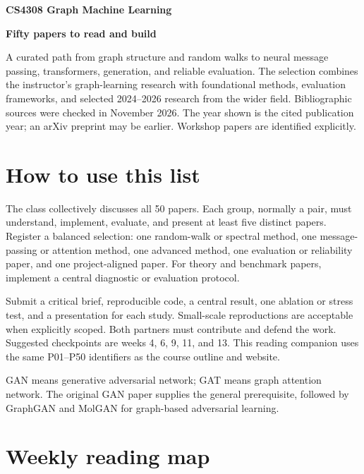 \documentclass[11pt,letterpaper]{article}
\begin{document}
{\Large\bfseries CS4308 Graph Machine Learning}\par
{\huge\bfseries Fifty papers to read and build}\par
\vspace{5pt}
A curated path from graph structure and random walks to neural message passing, transformers, generation, and reliable evaluation. The selection combines the instructor's graph-learning research with foundational methods, evaluation frameworks, and selected 2024--2026 research from the wider field. Bibliographic sources were checked in November 2026. The year shown is the cited publication year; an arXiv preprint may be earlier. Workshop papers are identified explicitly.
\section*{How to use this list}
The class collectively discusses all 50 papers. Each group, normally a pair, must understand, implement, evaluate, and present at least five distinct papers. Register a balanced selection: one random-walk or spectral method, one message-passing or attention method, one advanced method, one evaluation or reliability paper, and one project-aligned paper. For theory and benchmark papers, implement a central diagnostic or evaluation protocol.

Submit a critical brief, reproducible code, a central result, one ablation or stress test, and a presentation for each study. Small-scale reproductions are acceptable when explicitly scoped. Both partners must contribute and defend the work. Suggested checkpoints are weeks 4, 6, 9, 11, and 13. This reading companion uses the same P01--P50 identifiers as the course outline and website.

GAN means generative adversarial network; GAT means graph attention network. The original GAN paper supplies the general prerequisite, followed by GraphGAN and MolGAN for graph-based adversarial learning.
\section*{Weekly reading map}
\end{document}
